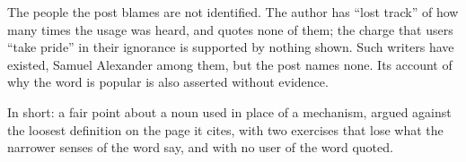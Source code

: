 \begin{afterword}
The people the post blames are not identified. The author has ``lost track'' of how many times the usage was heard, and quotes none of them; the charge that users ``take pride'' in their ignorance is supported by nothing shown. Such writers have existed, Samuel Alexander among them, but the post names none. Its account of why the word is popular is also asserted without evidence.

In short: a fair point about a noun used in place of a mechanism, argued against the loosest definition on the page it cites, with two exercises that lose what the narrower senses of the word say, and with no user of the word quoted.
\end{afterword}
